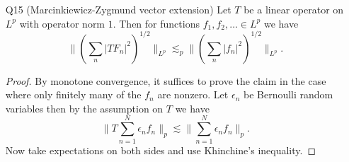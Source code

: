 \documentclass[11pt]{article}
\theoremstyle{remark}
\newcommand{\1}{\textbf{1}}
\newcommand{\lle}{\lesssim}
\def\norm#1{\| #1  \|}
\newcommand{\bbP}{\mathbb{P}}
\newcommand{\bbE}{\mathbb{E}}
\begin{document}
\begin{enumerate}
\[
\bbP \left\{  |\sum_{j=1}^N \epsilon_j x_j | \geq \lambda \left( \sum_{j=1}^N|x_j|^2\right)^{1/2}\right\} \lle e^{-\lambda^2/4}
\]
for all $0 < \lambda \leq	2 (\sum_{j=1}^N |x_j|^2)^{1/2}$.
\begin{proof}
We consider the random variable $\exp(t \sum_{j} \epsilon_j x_j)$ for a positive parameter $t$ and up to considering positive, negative, real and imaginary parts, it suffices to show
\[
\bbP \left\{  \sum_{j=1}^N \epsilon_j x_j  \geq \frac{\lambda}{4} \left( \sum_{j=1}^N|x_j|^2\right)^{1/2}\right\} = \bbP \left\{  \exp(t \sum_{j=1}^N \epsilon_j x_j ) \geq \exp\left(\frac{t \lambda}{4} ( \sum_{j=1}^N|x_j|^2)^{1/2}\right)\right\}
\]
Further, suppose $\sum |x_j|^2 = 1$. Now, by Chebychev's inequality,
\[
\bbP \left\{  \exp(t\sum_{j=1}^N \epsilon_j x_j ) \geq \exp\left(\frac{t\lambda}{4} \right)\right\} \leq \frac{\bbE \exp(t\sum_{j=1}^N \epsilon_j x_j ) }{\exp\left(\frac{t\lambda}{4}\right)}.
\]
We can expand
\[
\bbE \exp(t\sum_{j=1}^N \epsilon_j x_j ) = \bbE \prod_j \exp(t\epsilon_j x_j ) = \prod_j \bbE\exp(t\epsilon_j x_j ) = \prod_j \cosh(t x_j) .
\]
Since
\[
\prod_j \cosh(t x_j) \leq e^{\frac{t^2}{2} \sum_j x_j^2} = e^{\frac{t^2}{2}}, 
\]
we have
\[
\bbP \left\{  \exp(t\sum_{j=1}^N \epsilon_j x_j ) \geq \exp\left(\frac{t\lambda}{4}\right)\right\} \leq \frac{e^{\frac{t^2}{2}}}{{\exp\left(\frac{t\lambda}{4} \right)}} = e^{\frac{t^2}{2} - t\lambda/4}
\]
Finally, minimizing with $t = \lambda$, the result follows.
\end{proof}
\item[Q15] (Marcinkiewicz-Zygmund vector extension)
Let $T$ be a linear operator on $L^p$ with operator norm $1$. Then for functions $f_1, f_2, \ldots \in L^p$ we have
\[
\norm{ ( \sum_n |TF_n|^2 )^{1/2}}_{L^p} \lle_p \norm{(\sum_n |f_n|^2)^{1/2}}_{L^p}.
\]
\begin{proof}
By monotone convergence, it suffices to prove the claim in the case where only finitely many of the $f_n$ are nonzero. Let $\epsilon_n$ be Bernoulli random variables then by the assumption on $T$ we have
\[
\norm{T \sum_{n=1}^N \epsilon_n f_n}_p \lle \norm{\sum_{n=1}^N \epsilon_n f_n}_p.
\]
Now take expectations on both sides and use Khinchine's inequality.
\end{proof}
\end{enumerate}
\end{document}
